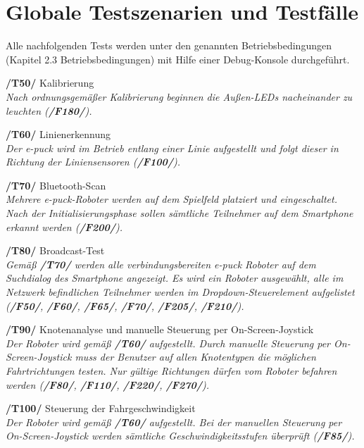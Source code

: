 \documentclass[10pt,a4paper]{article}
\let\oldsection\section
\renewcommand{\section}{\newpage \oldsection}
\begin{document}
	\section{Globale Testszenarien und Testfälle}	
		Alle nachfolgenden Tests werden unter den genannten Betriebsbedingungen (Kapitel 2.3 Betriebsbedingungen)
		mit Hilfe einer Debug-Konsole durchgeführt.
			\begin{list}{}{\leftmargin=1cm}
				\item[\textbf{/T50/}] Kalibrierung
					\\ \textsl{Nach ordnungsgemäßer Kalibrierung beginnen die Außen-LEDs nacheinander zu leuchten (\textbf{/F180/}).}
				\item[\textbf{/T60/}] Linienerkennung
					\\ \textsl{Der e-puck wird im Betrieb entlang einer Linie aufgestellt und folgt dieser in Richtung der
						Liniensensoren (\textbf{/F100/}).}		
				\item[\textbf{/T70/}] Bluetooth-Scan
					\\ \textsl{Mehrere e-puck-Roboter werden auf dem Spielfeld platziert und eingeschaltet. Nach der Initialisierungsphase
						sollen sämtliche Teilnehmer auf dem Smartphone erkannt werden (\textbf{/F200/}).}		
				\item[\textbf{/T80/}] Broadcast-Test
					\\ \textsl{Gemäß \textbf{/T70/} werden alle verbindungsbereiten e-puck Roboter auf dem Suchdialog des Smartphone
						angezeigt. Es wird ein Roboter ausgewählt, alle im Netzwerk befindlichen Teilnehmer werden im Dropdown-Steuerelement
						aufgelistet  (\textbf{/F50/}, \textbf{/F60/}, \textbf{/F65/}, \textbf{/F70/}, \textbf{/F205/}, \textbf{/F210/}).}		
				\item[\textbf{/T90/}] Knotenanalyse und manuelle Steuerung per On-Screen-Joystick
					\\ \textsl{Der Roboter wird gemäß \textbf{/T60/} aufgestellt. Durch manuelle Steuerung per On-Screen-Joystick muss der
						Benutzer 	auf allen Knotentypen die möglichen Fahrtrichtungen testen. Nur gültige Richtungen
						dürfen vom Roboter befahren werden (\textbf{/F80/}, \textbf{/F110/}, \textbf{/F220/}, \textbf{/F270/}).}
				\item[\textbf{/T100/}] Steuerung der Fahrgeschwindigkeit
					\\ \textsl{Der Roboter wird gemäß \textbf{/T60/} aufgestellt. Bei der manuellen Steuerung per On-Screen-Joystick werden
						sämtliche Geschwindigkeitsstufen überprüft (\textbf{/F85/}).}					

\end{list}
\end{document}
